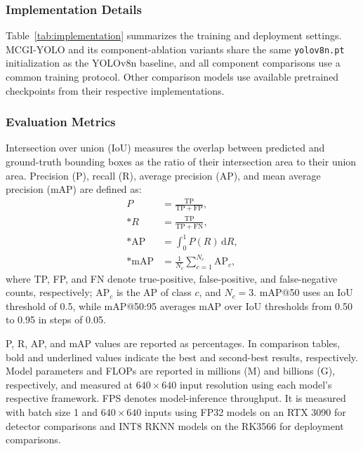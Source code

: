 \documentclass[a4paper,fleqn]{cas-dc}
\newcommand{\model}{MCGI-YOLO\xspace}
\begin{document}
\subsubsection{Implementation Details}
\label{sec:implementation}
Table~\ref{tab:implementation} summarizes the training and deployment settings. \model and its component-ablation variants share the same \texttt{yolov8n.pt} initialization as the YOLOv8n baseline, and all component comparisons use a common training protocol. Other comparison models use available pretrained checkpoints from their respective implementations.

\subsubsection{Evaluation Metrics}
\label{sec:evaluation}
Intersection over union (IoU) measures the overlap between predicted and ground-truth bounding boxes as the ratio of their intersection area to their union area. Precision (P), recall (R), average precision (AP), and mean average precision (mAP) are defined as:
\begin{align}
P &= \frac{\mathrm{TP}}{\mathrm{TP}+\mathrm{FP}},
\label{eq:precision}\\*
R &= \frac{\mathrm{TP}}{\mathrm{TP}+\mathrm{FN}},
\label{eq:recall}\\*
\mathrm{AP} &= \int_0^1 P(R)\,\mathrm{d}R,
\label{eq:ap}\\*
\mathrm{mAP} &= \frac{1}{N_c}\sum_{c=1}^{N_c}\mathrm{AP}_c,
\label{eq:metrics}
\end{align}
\noindent where TP, FP, and FN denote true-positive, false-positive, and false-negative counts, respectively; $\mathrm{AP}_c$ is the AP of class $c$, and $N_c=3$. mAP@50 uses an IoU threshold of 0.5, while mAP@50:95 averages mAP over IoU thresholds from 0.50 to 0.95 in steps of 0.05.

P, R, AP, and mAP values are reported as percentages. In comparison tables, bold and underlined values indicate the best and second-best results, respectively. Model parameters and FLOPs are reported in millions (M) and billions (G), respectively, and measured at $640\times640$ input resolution using each model's respective framework. FPS denotes model-inference throughput. It is measured with batch size 1 and $640\times640$ inputs using FP32 models on an RTX 3090 for detector comparisons and INT8 RKNN models on the RK3566 for deployment comparisons.
\end{document}

